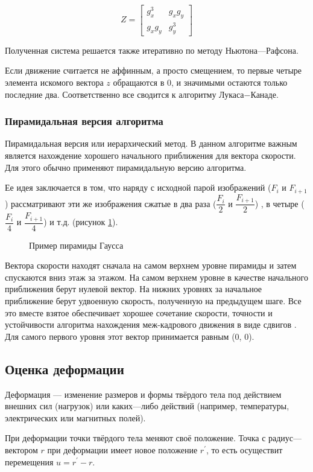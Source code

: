 $$Z=\begin{bmatrix}
g^3_x & g_xg_y \\
g_xg_y & g^3_y
\end{bmatrix}$$

Полученная система решается также итеративно по методу Ньютона—Рафсона.

Если движение считается не аффинным, а просто смещением, то первые четыре элемента искомого вектора $z$ обращаются в 0, и значимыми остаются только последние два. Соответственно все сводится к алгоритму Лукаса−Канаде.
\subsubsection{Пирамидальная версия алгоритма}
\label{subsec:pyramid}
Пирамидальная версия или иерархический метод. В данном алгоритме важным является нахождение хорошего начального приближения для вектора скорости. Для этого обычно применяют пирамидальную версию алгоритма. 

Ее идея заключается в том, что наряду с исходной парой изображений ($F_i$ и $F_{i+1}$) рассматривают эти же изображения сжатые в два раза ($\dfrac{F_i}{2}$ и $\dfrac{F_{i+1}}{2}$) , в четыре ($\dfrac{F_i}{4}$ и $\dfrac{F_{i+1}}{4}$) и т.д. (рисунок \ref{pic:pyramid}).
\begin{figure}[ht]
\caption{Пример пирамиды Гаусса}
\label{pic:pyramid}
\end{figure}

Вектора скорости находят сначала на самом верхнем уровне пирамиды и затем спускаются вниз этаж за этажом. На самом верхнем уровне в качестве начального приближения берут нулевой вектор. На нижних уровнях за начальное приближение берут удвоенную скорость, полученную на предыдущем шаге. Все это вместе взятое обеспечивает хорошее сочетание скорости, точности и устойчивости алгоритма нахождения меж-кадрового движения в виде сдвигов \cite{Bouguet2000}. Для самого первого уровня этот вектор принимается равным (0, 0).

\subsection{Оценка деформации}
Деформация — изменение размеров и формы твёрдого тела под действием внешних сил (нагрузок) или каких—либо действий (например, температуры, электрических или магнитных полей).

При деформации точки твёрдого тела меняют своё положение. Точка с радиус—вектором $r$ при деформации имеет новое положение $r^{'}$, то есть осуществит перемещения $u = r^{'} - r$. 

